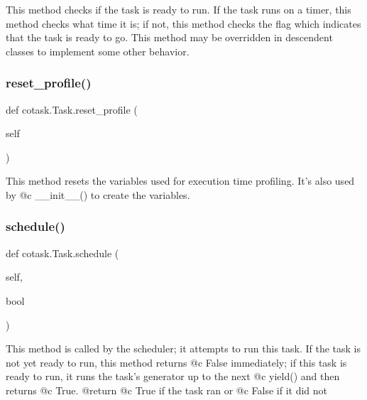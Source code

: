 \begin{DoxyVerb}This method checks if the task is ready to run. If the task
runs on a timer, this method checks what time it is; if not, this 
method checks the flag which indicates that the task is ready to go. 
This method may be overridden in descendent classes to implement some 
other behavior. \end{DoxyVerb}
 \mbox{\label{classcotask_1_1Task_a1bcbfa7dd7086112af20b7247ffa4a2e}} 
\subsubsection{\texorpdfstring{reset\+\_\+profile()}{reset\_profile()}}
{\footnotesize\ttfamily def cotask.\+Task.\+reset\+\_\+profile (\begin{DoxyParamCaption}\item[{}]{self }\end{DoxyParamCaption})}

\begin{DoxyVerb}This method resets the variables used for execution time 
profiling. It's also used by @c __init__() to create the variables.
\end{DoxyVerb}
 \mbox{\label{classcotask_1_1Task_a7c5bee1f632d4f71fd5ca02852b430a5}} 
\subsubsection{\texorpdfstring{schedule()}{schedule()}}
{\footnotesize\ttfamily def cotask.\+Task.\+schedule (\begin{DoxyParamCaption}\item[{}]{self,  }\item[{}]{bool }\end{DoxyParamCaption})}

\begin{DoxyVerb}This method is called by the scheduler; it attempts to run this 
task. If the task is not yet ready to run, this method returns 
@c False immediately; if this task is ready to run, it runs the 
task's generator up to the next @c yield() and then returns @c True.
@return @c True if the task ran or @c False if it did not
\end{DoxyVerb}
 


